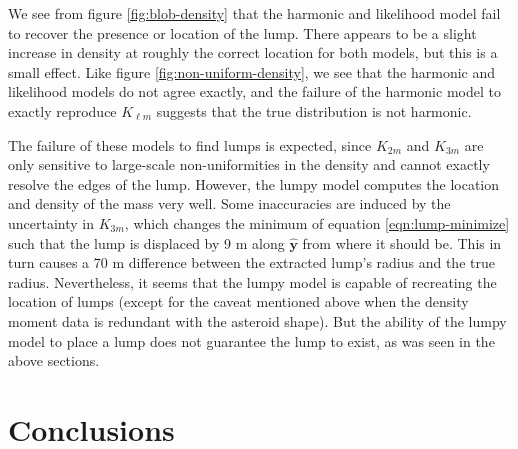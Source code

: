 \documentclass[fleqn,usenatbib]{mnras}
\newcommand{\unit}[1]{\bm{\hat{#1}}}
\begin{document}
We see from figure \ref{fig:blob-density} that the harmonic and likelihood model fail to recover the presence or location of the lump. There appears to be a slight increase in density at roughly the correct location for both models, but this is a small effect. Like figure \ref{fig:non-uniform-density}, we see that the harmonic and likelihood models do not agree exactly, and the failure of the harmonic model to exactly reproduce $K_{\ell m}$ suggests that the true distribution is not harmonic.

The failure of these models to find lumps is expected, since $K_{2 m}$ and $K_{3 m}$ are only sensitive to large-scale non-uniformities in the density and cannot exactly resolve the edges of the lump. However, the lumpy model computes the location and density of the mass very well. Some inaccuracies are induced by the uncertainty in $K_{3m}$, which changes the minimum of equation \ref{eqn:lump-minimize} such that the lump is displaced by 9 m along $\unit y$ from where it should be. This in turn causes a 70 m difference between the extracted lump's radius and the true radius. Nevertheless, it seems that the lumpy model is capable of recreating the location of lumps (except for the caveat mentioned above when the density moment data is redundant with the asteroid shape). But the ability of the lumpy model to place a lump does not guarantee the lump to exist, as was seen in the above sections.

\section{Conclusions}
\end{document}
